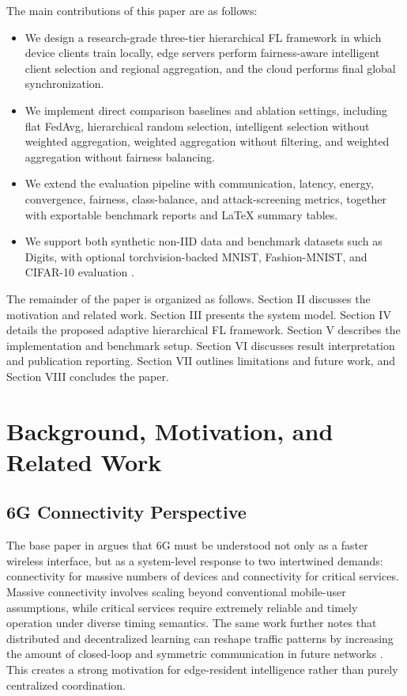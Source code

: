 \documentclass[conference]{IEEEtran}
\begin{document}
The main contributions of this paper are as follows:
\begin{itemize}
    \item We design a research-grade three-tier hierarchical FL framework in which device clients train locally, edge servers perform fairness-aware intelligent client selection and regional aggregation, and the cloud performs final global synchronization.
    \item We implement direct comparison baselines and ablation settings, including flat FedAvg, hierarchical random selection, intelligent selection without weighted aggregation, weighted aggregation without filtering, and weighted aggregation without fairness balancing.
    \item We extend the evaluation pipeline with communication, latency, energy, convergence, fairness, class-balance, and attack-screening metrics, together with exportable benchmark reports and \LaTeX{} summary tables.
    \item We support both synthetic non-IID data and benchmark datasets such as Digits, with optional torchvision-backed MNIST, Fashion-MNIST, and CIFAR-10 evaluation \cite{darshit2026repo}.
\end{itemize}

The remainder of the paper is organized as follows. Section II discusses the motivation and related work. Section III presents the system model. Section IV details the proposed adaptive hierarchical FL framework. Section V describes the implementation and benchmark setup. Section VI discusses result interpretation and publication reporting. Section VII outlines limitations and future work, and Section VIII concludes the paper.

\section{Background, Motivation, and Related Work}
\subsection{6G Connectivity Perspective}
The base paper in \cite{kalor2025wireless6g} argues that 6G must be understood not only as a faster wireless interface, but as a system-level response to two intertwined demands: connectivity for massive numbers of devices and connectivity for critical services. Massive connectivity involves scaling beyond conventional mobile-user assumptions, while critical services require extremely reliable and timely operation under diverse timing semantics. The same work further notes that distributed and decentralized learning can reshape traffic patterns by increasing the amount of closed-loop and symmetric communication in future networks \cite{kalor2025wireless6g}. This creates a strong motivation for edge-resident intelligence rather than purely centralized coordination.
\end{document}
